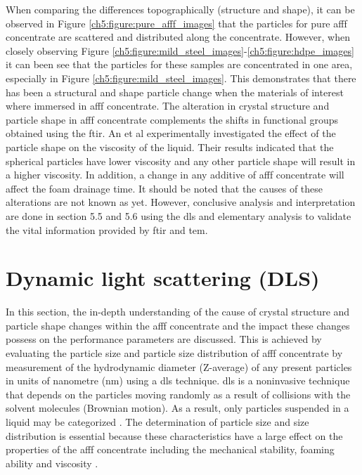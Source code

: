 When comparing the differences topographically (structure and shape), it can be observed in Figure \ref{ch5:figure:pure_afff_images} that the particles for pure \acrshort{afff} concentrate are scattered and distributed along the concentrate. However, when closely observing Figure \ref{ch5:figure:mild_steel_images}-\ref{ch5:figure:hdpe_images} it can been see that the particles for these samples are concentrated in one area, especially in Figure \ref{ch5:figure:mild_steel_images}. This demonstrates that there has been a structural and shape particle change when the materials of interest where immersed in \acrshort{afff} concentrate. The alteration in crystal structure and particle shape in \acrshort{afff} concentrate complements the shifts in functional groups obtained using the \acrshort{ftir}. An et al \cite{lin1991handbook} experimentally investigated the effect of the particle shape on the viscosity of the liquid. Their results indicated that the spherical particles have lower viscosity and any other particle shape will result in a higher viscosity. In addition, a change in any additive of \acrshort{afff} concentrate will affect the foam drainage time. It should be noted that the causes of these alterations are not known as yet. However, conclusive analysis and interpretation are done in section 5.5 and 5.6 using the \acrshort{dls} and elementary analysis to validate the vital information provided by \acrshort{ftir} and \acrshort{tem}.

\section{Dynamic light scattering (DLS)}
In this section, the in-depth understanding of the cause of crystal structure and particle shape changes within the \acrshort{afff} concentrate and the impact these changes possess on the performance parameters are discussed. This is achieved by evaluating the particle size and particle size distribution of \acrshort{afff} concentrate by measurement of the hydrodynamic diameter (Z-average) of any present particles in units of nanometre (nm) using a \acrshort{dls} technique. \acrshort{dls} is a noninvasive technique that depends on the particles moving randomly as a result of collisions with the solvent molecules (Brownian motion). As a result, only particles suspended in a liquid may be categorized \cite{mudunkotuwa2014atr}. The determination of particle size and size distribution is essential because these characteristics have a large effect on the properties of the \acrshort{afff} concentrate including the mechanical stability, foaming ability and viscosity \cite{mohamed2017fourier}.

